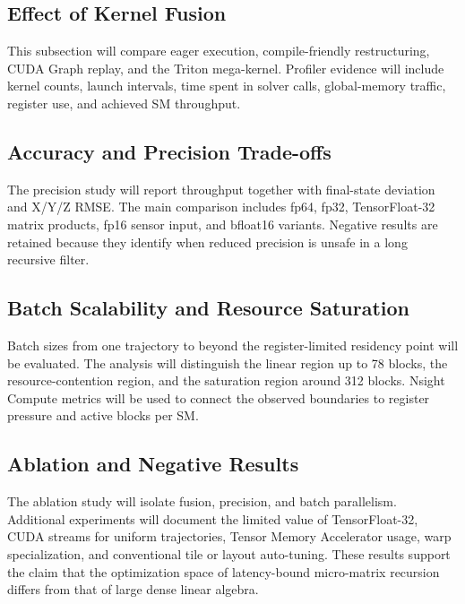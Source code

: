 \documentclass[research]{fcs}
\begin{document}
\subsection{Effect of Kernel Fusion}
\label{subsec:fusion-evaluation}

This subsection will compare eager execution, compile-friendly restructuring, CUDA Graph replay, and the Triton mega-kernel. Profiler evidence will include kernel counts, launch intervals, time spent in solver calls, global-memory traffic, register use, and achieved SM throughput.

\subsection{Accuracy and Precision Trade-offs}
\label{subsec:precision-evaluation}

The precision study will report throughput together with final-state deviation and X/Y/Z RMSE. The main comparison includes fp64, fp32, TensorFloat-32 matrix products, fp16 sensor input, and bfloat16 variants. Negative results are retained because they identify when reduced precision is unsafe in a long recursive filter.

\subsection{Batch Scalability and Resource Saturation}
\label{subsec:batch-evaluation}

Batch sizes from one trajectory to beyond the register-limited residency point will be evaluated. The analysis will distinguish the linear region up to 78 blocks, the resource-contention region, and the saturation region around 312 blocks. Nsight Compute metrics will be used to connect the observed boundaries to register pressure and active blocks per SM.

\subsection{Ablation and Negative Results}
\label{subsec:ablation}

The ablation study will isolate fusion, precision, and batch parallelism. Additional experiments will document the limited value of TensorFloat-32, CUDA streams for uniform trajectories, Tensor Memory Accelerator usage, warp specialization, and conventional tile or layout auto-tuning. These results support the claim that the optimization space of latency-bound micro-matrix recursion differs from that of large dense linear algebra.
\end{document}
